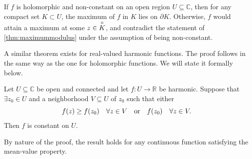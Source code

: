 \begin{remark}
    If \(f\) is holomorphic and non-constant on an open region \(U\subseteq\mathbb{C}\), then for any compact set \(K\subset U\), the maximum of \(f\) in \(K\) lies on \(\partial K\). Otherwise, \(f\) would attain a maximum at some \(z\in\overset{\circ}{K}\), and contradict the statement of \cref{thm:maximummodulus} under the assumption of being non-constant.
\end{remark}
A similar theorem exists for real-valued harmonic functions. The proof follows in the same way as the one for holomorphic functions. We will state it formally below.
\begin{theorem}\label{thm:maximumprincipleforrealharmonicfunctions}
    Let \(U\subseteq\mathbb{C}\) be open and connected and let \(f:U\to\mathbb{R}\) be harmonic. Suppose that \(\exists z_0\in U\) and a neighborhood \(V\subseteq U\) of \(z_0\) such that either \[f(z)\geq f\qty(z_0)\quad\forall z\in V\qq{or}f\qty(z_0)\quad\forall z\in V.\]
    Then \(f\) is constant on \(U\).
\end{theorem}
By nature of the proof, the result holds for any continuous function satisfying the mean-value property.
